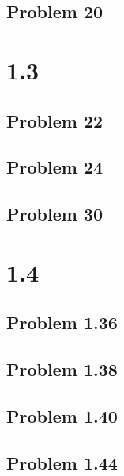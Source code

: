 \documentclass{article}
\begin{document}
	\subsection*{Problem 20}
	
	\section{1.3}
	\subsection*{Problem 22}
	\subsection*{Problem 24}
	\subsection*{Problem 30}
	
	\section{1.4}
	\subsection*{Problem 1.36}
	\subsection*{Problem 1.38}
	\subsection*{Problem 1.40}
	\subsection*{Problem 1.44}
	
	
\end{document}

